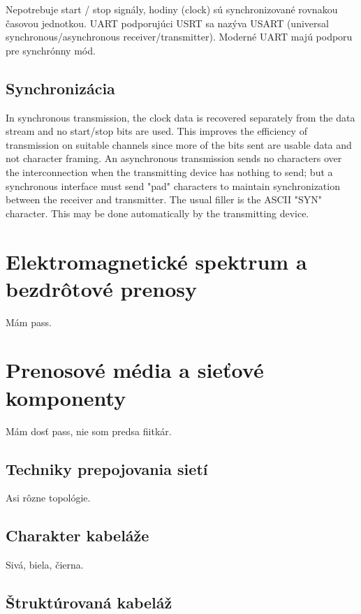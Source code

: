 \documentclass[10pt,a4paper]{article}
\begin{document}
Nepotrebuje start / stop signály, hodiny (clock) sú synchronizované rovnakou časovou jednotkou.
UART podporujúci USRT sa nazýva USART (universal synchronous/asynchronous receiver/transmitter).
Moderné UART majú podporu pre synchrónny mód. 
  
\subsection{Synchronizácia}   
In synchronous transmission, the clock data is recovered separately from the data stream and no start/stop bits are used. This improves the efficiency of transmission on suitable channels since more of the bits sent are usable data and not character framing. An asynchronous transmission sends no characters over the interconnection when the transmitting device has nothing to send; but a synchronous interface must send "pad" characters to maintain synchronization between the receiver and transmitter. The usual filler is the ASCII "SYN" character. This may be done automatically by the transmitting device.

\section{Elektromagnetické spektrum a bezdrôtové prenosy}  

Mám pass. 

\section{Prenosové média a sieťové komponenty} 
Mám dosť pass, nie som predsa fiitkár. 

\subsection{Techniky prepojovania sietí}  
Asi rôzne topológie. 

\subsection{Charakter kabeláže}     
Sivá, biela, čierna. 

\subsection{Štruktúrovaná kabeláž}  
\end{document}
